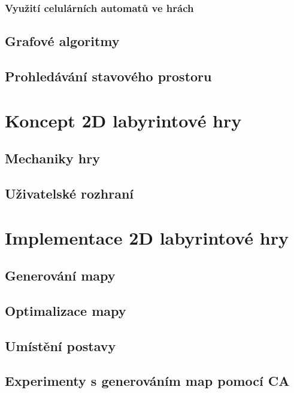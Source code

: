 \subsection*{Využití celulárních automatů ve hrách}

\section{Grafové algoritmy}
\section{Prohledávání stavového prostoru}

\chapter{Koncept 2D labyrintové hry}

\section{Mechaniky hry}

\section{Uživatelské rozhraní}

\chapter{Implementace 2D labyrintové hry} %
\section{Generování mapy}
\section{Optimalizace mapy}
\section{Umístění postavy} %
\section{Experimenty s generováním map pomocí CA} %

